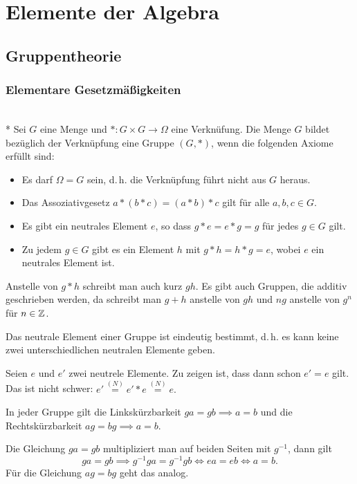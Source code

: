 
\chapter{Elemente der Algebra}

\section{Gruppentheorie}

\subsection{Elementare Gesetzmäßigkeiten}
\begin{Definition}[Gruppe]\mbox{}\\*
Sei $G$ eine Menge und $*\colon G\times G\to\Omega$ eine Verknüfung.
Die Menge $G$ bildet bezüglich der Verknüpfung eine Gruppe $(G,*)$,
wenn die folgenden Axiome erfüllt sind:
\begin{itemize}
\item[\strong{(E)}]
Es darf $\Omega=G$ sein, d.\,h. die Verknüpfung führt nicht aus $G$ heraus.
\item[\strong{(A)}]
Das Assoziativgesetz $a*(b*c)=(a*b)*c$ gilt für alle $a,b,c\in G$.
\item[\strong{(N)}]
Es gibt ein neutrales Element $e$, so dass $g*e=e*g=g$ für jedes
$g\in G$ gilt.
\item[\strong{(I)}]
Zu jedem $g\in G$ gibt es ein Element $h$ mit $g*h=h*g=e$,
wobei $e$ ein neutrales Element ist.
\end{itemize}
\end{Definition}
Anstelle von $g*h$ schreibt man auch kurz $gh$. Es gibt auch Gruppen,
die additiv geschrieben werden, da schreibt man $g+h$ anstelle von
$gh$ und $ng$ anstelle von $g^n$ für $n\in\mathbb Z$.

\begin{Satz} Das neutrale Element einer Gruppe ist eindeutig bestimmt,
d.\,h. es kann keine zwei unterschiedlichen neutralen Elemente geben.
\end{Satz}
 Seien $e$ und $e'$ zwei neutrele Elemente.
Zu zeigen ist, dass dann schon $e'=e$ gilt. Das ist nicht schwer:
$e' \stackrel{(N)}= e'*e \stackrel{(N)}= e.$\;\qedsymbol

\begin{Satz}
In jeder Gruppe gilt die Linkskürzbarkeit $ga=gb\implies a=b$
und die Rechtskürzbarkeit $ag=bg\implies a=b$.
\end{Satz}
 Die Gleichung $ga=gb$ multipliziert man auf beiden
Seiten mit $g^{-1}$, dann gilt
\[ga=gb \implies g^{-1}ga=g^{-1}gb \iff ea=eb \iff a=b.\]
Für die Gleichung $ag=bg$ geht das analog.\;\qedsymbol


